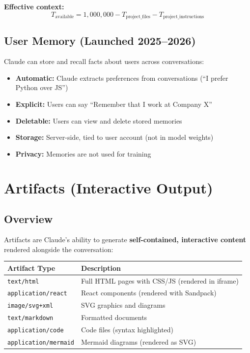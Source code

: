 \documentclass[11pt,a4paper]{article}
\begin{document}
\textbf{Effective context:}
$$T_{\text{available}} = 1{,}000{,}000 - T_{\text{project\_files}} - T_{\text{project\_instructions}}$$

\subsection{User Memory (Launched 2025--2026)}

Claude can store and recall facts about users across conversations:

\begin{itemize}[itemsep=1pt]
  \item \textbf{Automatic:} Claude extracts preferences from conversations (``I prefer Python over JS'')
  \item \textbf{Explicit:} Users can say ``Remember that I work at Company X''
  \item \textbf{Deletable:} Users can view and delete stored memories
  \item \textbf{Storage:} Server-side, tied to user account (not in model weights)
  \item \textbf{Privacy:} Memories are not used for training
\end{itemize}

\section{Artifacts (Interactive Output)}

\subsection{Overview}

Artifacts are Claude's ability to generate \textbf{self-contained, interactive content} rendered alongside the conversation:

\begin{center}
\begin{tabular}{lL{9cm}}
\toprule
\textbf{Artifact Type} & \textbf{Description} \\
\midrule
\texttt{text/html} & Full HTML pages with CSS/JS (rendered in iframe) \\
\texttt{application/react} & React components (rendered with Sandpack) \\
\texttt{image/svg+xml} & SVG graphics and diagrams \\
\texttt{text/markdown} & Formatted documents \\
\texttt{application/code} & Code files (syntax highlighted) \\
\texttt{application/mermaid} & Mermaid diagrams (rendered as SVG) \\
\bottomrule
\end{tabular}
\end{center}
\end{document}
